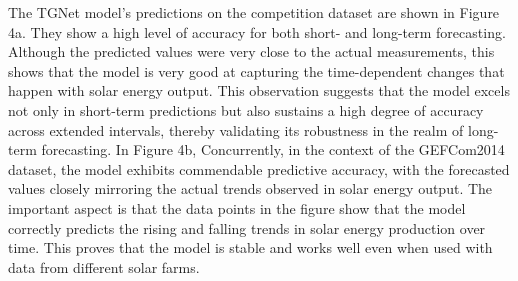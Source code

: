 \documentclass[sn-mathphys-num]{sn-jnl}%
\begin{document}
The TGNet model's predictions on the competition dataset are shown in Figure 4a. They show a high level of accuracy for both short- and long-term forecasting. Although the predicted values were very close to the actual measurements, this shows that the model is very good at capturing the time-dependent changes that happen with solar energy output. This observation suggests that the model excels not only in short-term predictions but also sustains a high degree of accuracy across extended intervals, thereby validating its robustness in the realm of long-term forecasting.
In Figure 4b, Concurrently, in the context of the GEFCom2014 dataset, the model exhibits commendable predictive accuracy, with the forecasted values closely mirroring the actual trends observed in solar energy output. The important aspect is that the data points in the figure show that the model correctly predicts the rising and falling trends in solar energy production over time. This proves that the model is stable and works well even when used with data from different solar farms.

\end{document}
